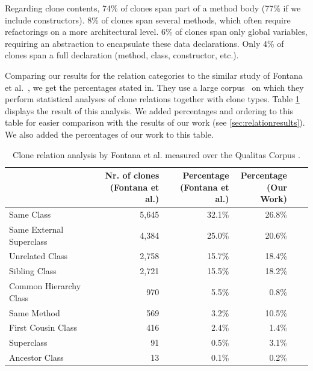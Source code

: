 \documentclass[runningheads]{llncs}
\begin{document}
Regarding clone contents, 74\% of clones span part of a method body (77\% if we include constructors). 8\% of clones span several methods, which often require refactorings on a more architectural level. 6\% of clones span only global variables, requiring an abstraction to encapsulate these data declarations. Only 4\% of clones span a full declaration (method, class, constructor, etc.).

Comparing our results for the relation categories to the similar study of Fontana et al.~\cite{fontana2012duplicated, fontana2015duplicated}, we get the percentages stated in. They use a large corpus~\cite{tempero2010qualitas} on which they perform statistical analyses of clone relations together with clone types. Table \ref{tab:dcra-relation} displays the result of this analysis. We added percentages and ordering to this table for easier comparison with the results of our work (see \ref{sec:relationresults}). We also added the percentages of our work to this table.

\begin{table}[H]
\centering
\caption{Clone relation analysis by Fontana et al. \cite{fontana2012duplicated} measured over the Qualitas Corpus \cite{tempero2010qualitas}.}
\begin{tabular}{@{}lrrrrr@{}}
\toprule
                         & \makecell{Nr. of clones\\(Fontana et al.)} & \makecell{Percentage\\(Fontana et al.)} & \makecell{Percentage\\(Our Work)} \\ \midrule
Same Class               & 5,645  & 32.1\%     & 26.8\%    \\
Same External Superclass & 4,384  & 25.0\%     & 20.6\%   \\
Unrelated Class          & 2,758  & 15.7\%     & 18.4\%    \\
Sibling Class            & 2,721  & 15.5\%     & 18.2\%    \\
Common Hierarchy Class   & 970    & 5.5\%      & 0.8\%    \\
Same Method              & 569    & 3.2\%      & 10.5\%    \\
First Cousin Class       & 416    & 2.4\%      & 1.4\%    \\
Superclass               & 91     & 0.5\%      & 3.1\%    \\
Ancestor Class           & 13     & 0.1\%      & 0.2\%    \\ \bottomrule
\end{tabular}

\label{tab:dcra-relation}
\end{table}
\end{document}

